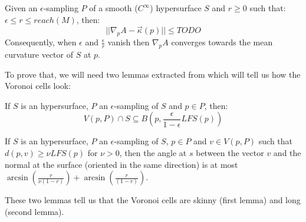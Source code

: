 \begin{proposition}
    \label{prop:gradient-mean-curvature}
    Given an $\epsilon$-sampling $ P $ of a smooth ($ C^{\infty} $) hypersurface
    $ S $ and $ r \ge 0 $ such that: $ \epsilon \leq r \leq reach(M) $, then:
    $$ || \nabla_p A - \vec{\kappa}(p) || \leq TODO $$
    Consequently, when $ \epsilon $ and $ \frac{\epsilon}{r} $ vanish then
    $ \nabla_p A $ converges towards the mean curvature vector of $ S $ at $ p $.
\end{proposition}

To prove that, we will need two lemmas extracted from \cite{amenta1999surface}
which will tell us how the Voronoi cells look:
\begin{lemma}
    If $ S $ is an hypersurface, $ P $ an $\epsilon$-sampling of $ S $ and $ p
    \in P $, then:
    $$ V(p, P) \cap S \subseteq B\left(p, \frac{\epsilon}{1 - \epsilon}
        LFS(p)\right) $$
\end{lemma}

\begin{lemma}
    If $ S $ is an hypersurface, $ P $ an $\epsilon$-sampling of $ S $, $ p
    \in P $ and $ v \in V(p, P) $ such that $ d(p, v) \ge \nu LFS(p) $ for $ \nu
    > 0 $, then the angle at $ s $ between the vector $ v $ and the normal at
    the surface (oriented in the same direction) is at most $
    \arcsin(\frac{r}{\nu(1-r)}) + \arcsin(\frac{r}{(1-r)}) $.
\end{lemma}

These two lemmas tell us that the Voronoi cells are skinny (first lemma) and
long (second lemma).

